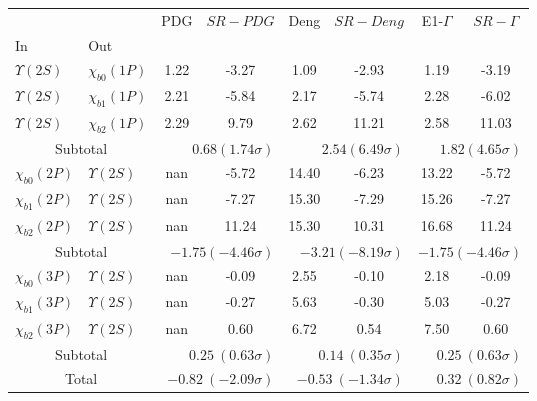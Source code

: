 \begin{tabular}{|l|l|c|c|c|c|c|c|}%
\hline%
&&PDG&$SR-PDG$&Deng&$SR-Deng$&E1-$\Gamma$&$SR-\Gamma$\\%
In&Out&&&&&&\\%
\hline%
$\Upsilon(2S)$&$\chi_{b0}(1P)$&1.22&-3.27&1.09&-2.93&1.19&-3.19\\%
$\Upsilon(2S)$&$\chi_{b1}(1P)$&2.21&-5.84&2.17&-5.74&2.28&-6.02\\%
$\Upsilon(2S)$&$\chi_{b2}(1P)$&2.29&9.79&2.62&11.21&2.58&11.03\\%
\hline%
\hline%
\multicolumn{2}{|c|}{Subtotal}&\multicolumn{2}{|r|}{$0.68 (1.74\sigma)$}&\multicolumn{2}{|r|}{$2.54 (6.49\sigma)$}&\multicolumn{2}{|r|}{$1.82 (4.65\sigma)$}\\%
\hline%
\hline%
$\chi_{b0}(2P)$&$\Upsilon(2S)$&nan&-5.72&14.40&-6.23&13.22&-5.72\\%
$\chi_{b1}(2P)$&$\Upsilon(2S)$&nan&-7.27&15.30&-7.29&15.26&-7.27\\%
$\chi_{b2}(2P)$&$\Upsilon(2S)$&nan&11.24&15.30&10.31&16.68&11.24\\%
\hline%
\hline%
\multicolumn{2}{|c|}{Subtotal}&\multicolumn{2}{|r|}{$-1.75 (-4.46\sigma)$}&\multicolumn{2}{|r|}{$-3.21 (-8.19\sigma)$}&\multicolumn{2}{|r|}{$-1.75 (-4.46\sigma)$}\\%
\hline%
\hline%
$\chi_{b0}(3P)$&$\Upsilon(2S)$&nan&-0.09&2.55&-0.10&2.18&-0.09\\%
$\chi_{b1}(3P)$&$\Upsilon(2S)$&nan&-0.27&5.63&-0.30&5.03&-0.27\\%
$\chi_{b2}(3P)$&$\Upsilon(2S)$&nan&0.60&6.72&0.54&7.50&0.60\\%
\hline%
\hline%
\multicolumn{2}{|c|}{Subtotal}&\multicolumn{2}{|r|}{$0.25~(0.63\sigma)$}&\multicolumn{2}{|r|}{$0.14~(0.35\sigma)$}&\multicolumn{2}{|r|}{$0.25~(0.63\sigma)$}\\%
\hline%
\hline%
\multicolumn{2}{|c|}{Total}&\multicolumn{2}{|r|}{$-0.82~(-2.09\sigma)$}&\multicolumn{2}{|r|}{$-0.53~(-1.34\sigma)$}&\multicolumn{2}{|r|}{$0.32~(0.82\sigma)$}\\%
\hline%
\end{tabular}